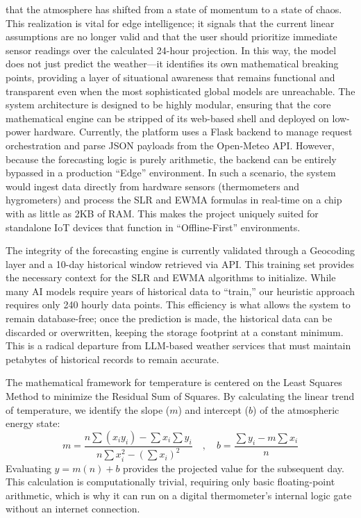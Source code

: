 \documentclass[14pt]{extarticle}
\begin{document}
that the atmosphere has shifted from a state of momentum to a state of chaos.
This realization is vital for edge intelligence; it signals that the current
linear assumptions are no longer valid and that the user should prioritize
immediate sensor readings over the calculated 24-hour projection. In this way,
the model does not just predict the weather—it identifies its own mathematical
breaking points, providing a layer of situational awareness that remains
functional and transparent even when the most sophisticated global models are
unreachable.
\medskip
\noindent The system architecture is designed to be highly modular, ensuring that the core mathematical engine can be stripped of its web-based shell and deployed on low-power hardware. Currently, the platform uses a Flask backend to manage request orchestration and parse JSON payloads from the Open-Meteo API. However, because the forecasting logic is purely arithmetic, the backend can be entirely bypassed in a production ``Edge'' environment. In such a scenario, the system would ingest data directly from hardware sensors (thermometers and hygrometers) and process the SLR and EWMA formulas in real-time on a chip with as little as 2KB of RAM. This makes the project uniquely suited for standalone IoT devices that function in ``Offline-First'' environments.

\medskip

\noindent The integrity of the forecasting engine is currently validated through a Geocoding layer and a 10-day historical window retrieved via API. This training set provides the necessary context for the SLR and EWMA algorithms to initialize. While many AI models require years of historical data to ``train,'' our heuristic approach requires only 240 hourly data points. This efficiency is what allows the system to remain database-free; once the prediction is made, the historical data can be discarded or overwritten, keeping the storage footprint at a constant minimum. This is a radical departure from LLM-based weather services that must maintain petabytes of historical records to remain accurate.

\medskip

\noindent The mathematical framework for temperature is centered on the Least Squares Method to minimize the Residual Sum of Squares. By calculating the linear trend of temperature, we identify the slope ($m$) and intercept ($b$) of the atmospheric energy state:
\begin{equation}
m = \frac{n\sum(x_iy_i) - \sum x_i \sum y_i}{n\sum x_i^2 - (\sum x_i)^2} \quad , \quad b = \frac{\sum y_i - m \sum x_i}{n}
\end{equation}
Evaluating $y = m(n) + b$ provides the projected value for the subsequent day. This calculation is computationally trivial, requiring only basic floating-point arithmetic, which is why it can run on a digital thermometer's internal logic gate without an internet connection.
\end{document}
